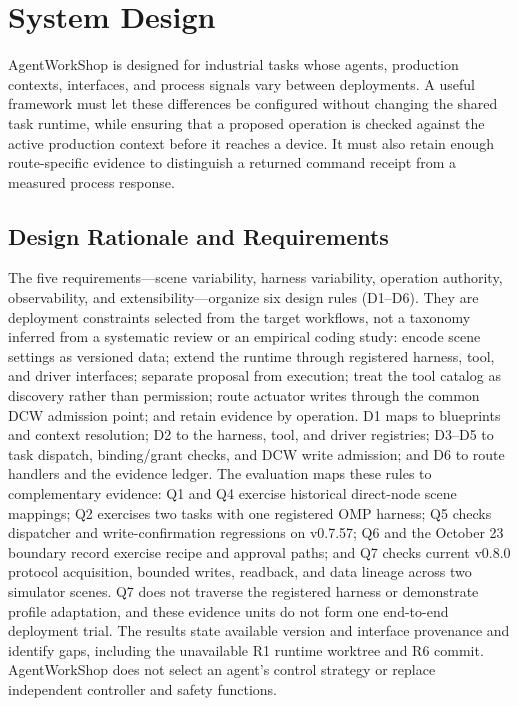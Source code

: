 \section{System Design}
\label{sec:design}
AgentWorkShop is designed for industrial tasks whose agents, production
contexts, interfaces, and process signals vary between deployments. A useful
framework must let these differences be configured without changing the
shared task runtime, while ensuring that a proposed operation is checked
against the active production context before it reaches a device. It must also
retain enough route-specific evidence to distinguish a returned command
receipt from a measured process response.

\subsection{Design Rationale and Requirements}
\label{sec:principles}
The five requirements---scene variability, harness variability, operation
authority, observability, and extensibility---organize six design rules
(D1--D6). They are deployment constraints selected from the target workflows,
not a taxonomy inferred from a systematic review or an empirical coding study:
encode scene settings as versioned data; extend the runtime through registered
harness, tool, and driver interfaces; separate proposal from execution; treat
the tool catalog as discovery rather than permission; route actuator writes
through the common DCW admission point; and retain evidence by operation.
D1 maps to blueprints and context resolution; D2 to the harness, tool, and
driver registries; D3--D5 to task dispatch, binding/grant checks, and DCW
write admission; and D6 to route handlers and the evidence ledger. The
evaluation maps these rules to complementary evidence: Q1 and Q4 exercise
historical direct-node scene mappings; Q2 exercises two tasks with one
registered OMP harness; Q5 checks dispatcher and write-confirmation regressions
on v0.7.57; Q6 and the October 23 boundary record exercise recipe and approval
paths; and Q7 checks current v0.8.0 protocol acquisition, bounded writes,
readback, and data lineage across two simulator scenes. Q7 does not traverse
the registered harness or demonstrate profile adaptation, and these evidence
units do not form one end-to-end deployment trial. The results state available
version and interface provenance and identify gaps, including the unavailable
R1 runtime worktree and R6 commit. AgentWorkShop does not select an agent's
control strategy or replace independent controller and safety functions.

